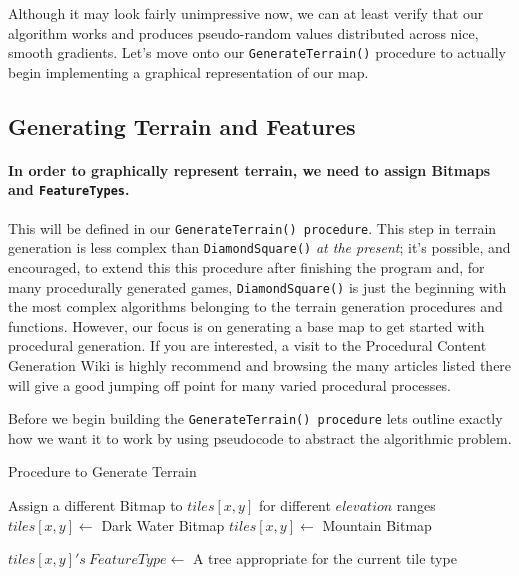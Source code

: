 \documentclass{article}
\begin{document}
Although it may look fairly unimpressive now, we can at least verify that our algorithm works and produces pseudo-random values distributed across nice, smooth gradients. Let's move onto our \texttt{GenerateTerrain()} procedure to actually begin implementing a graphical representation of our map.

\subsection{Generating Terrain and Features}

\paragraph{In order to graphically represent terrain, we need to assign Bitmaps and \texttt{FeatureTypes}.} This will be defined in our \texttt{GenerateTerrain() procedure}. This step in terrain generation is less complex than \texttt{DiamondSquare()} \emph{at the present}; it's possible, and encouraged, to extend this this procedure after finishing the program and, for many procedurally generated games, \texttt{DiamondSquare()} is just the beginning with the most complex algorithms belonging to the terrain generation procedures and functions. However, our focus is on generating a base map to get started with procedural generation. If you are interested, a visit to the Procedural Content Generation Wiki \parencite{pcg} is highly recommend and browsing the many articles listed there will give a good jumping off point for many varied procedural processes.

Before we begin building the \texttt{GenerateTerrain() procedure} lets outline exactly how we want it to work by using pseudocode to abstract the algorithmic problem.

\begin{algorithm}[H]
\caption{Procedure to Generate Terrain}
\begin{algorithmic}
	 
			\State Assign a different Bitmap to $tiles[x, y]$ for different $elevation$ ranges
				\State $tiles[x, y] \gets$ Dark Water Bitmap
			\Else
				\State $tiles[x, y] \gets$ Mountain Bitmap 
			\EndIf
			
				\State $tiles[x, y]'s \ FeatureType \gets$ A tree appropriate for the current tile type
			\EndIf
		\EndFor
	\EndFor
\EndProcedure	
\end{algorithmic}
\end{algorithm}
\end{document}
